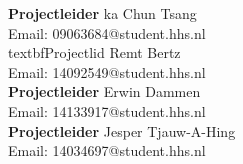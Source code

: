 \textbf{Projectleider}
ka Chun Tsang\\
Email: 09063684@student.hhs.nl\\[0.5cm]

textbf{Projectlid}
Remt Bertz\\
Email: 14092549@student.hhs.nl\\[0.5cm]

\textbf{Projectleider}
Erwin Dammen\\
Email: 14133917@student.hhs.nl\\[0.5cm]

\textbf{Projectleider}
Jesper Tjauw-A-Hing\\
Email: 14034697@student.hhs.nl\\[0.5cm]


\newpage